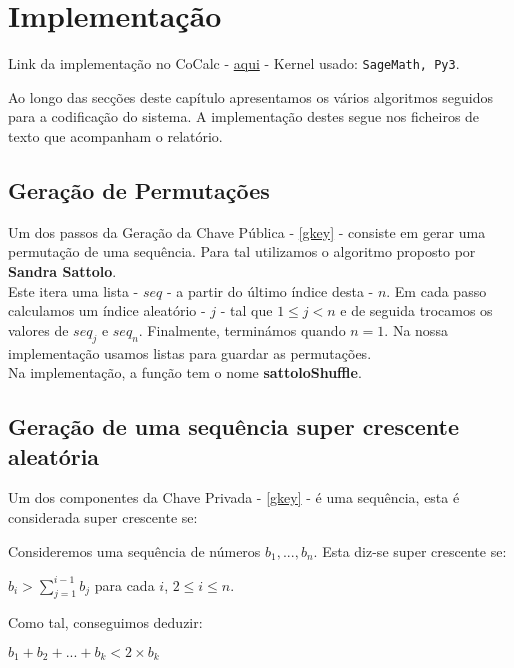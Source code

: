 \documentclass[11pt, language=portuguese]{report}
\begin{document}
\chapter{Implementação}

Link da implementação no CoCalc - \href{https://cocalc.com/share/1bede121-9d2a-477f-be2c-1dea8a3a05a6/Merkle-Hellman%20knapsack.ipynb?viewer=share}{aqui} - Kernel usado: \texttt{SageMath, Py3}.

Ao longo das secções deste capítulo apresentamos os vários algoritmos seguidos para a codificação do sistema.
A implementação destes segue nos ficheiros de texto que acompanham o relatório.

\section{Geração de Permutações}
\label{perm}

Um dos passos da Geração da Chave Pública - \ref{gkey} - consiste em gerar uma permutação de uma sequência. Para tal utilizamos o algoritmo proposto por \textbf{Sandra Sattolo}\autocite{sattolo}.\\
Este itera uma lista - $seq$ - a partir do último índice desta - $n$. Em cada passo calculamos um índice aleatório - $j$ - tal que $1 \le j < n$ e de seguida trocamos os valores de $seq_j$ e $seq_n$. Finalmente, terminámos quando $n = 1$. Na nossa implementação usamos listas para guardar as permutações.\\
Na implementação, a função tem o nome \textbf{sattoloShuffle}.

\section{Geração de uma sequência super crescente aleatória}
\label{seq}

Um dos componentes da Chave Privada - \ref{gkey} - é uma sequência, esta é considerada super crescente se:\\
\begin{definition}
	Consideremos uma sequência de números ${b_1, ..., b_n}$. Esta diz-se super crescente se:
	\begin{center}
		$b_i > \sum_{j = 1}^{i - 1} b_j$ para cada $i$, $2 \le i \le n$.
	\end{center}
\end{definition}

Como tal, conseguimos deduzir:

\begin{center}
	$b_1 + b_2 + ... + b_k < 2 \times b_k$
\end{center}
\end{document}
